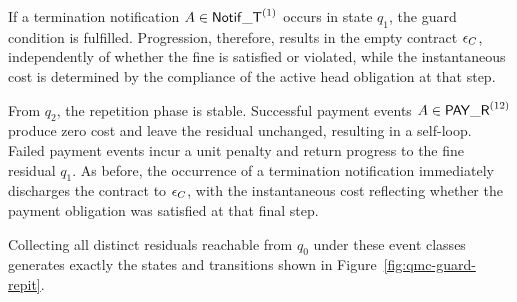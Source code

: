 \begin{example}
    If a termination notification $A \in \mathsf{Notif\_T}^{(1)}$ occurs in state $q_1$, the guard condition is fulfilled. Progression, therefore, results in the empty contract $\epsilon_{C}$, independently of whether the fine is satisfied or violated, while the instantaneous cost is determined by the compliance of the active head obligation at that step.
    
    From $q_2$, the repetition phase is stable. Successful payment events $A \in \mathsf{PAY\_R}^{(12)}$ produce zero cost and leave the residual unchanged, resulting in a self-loop. Failed payment events incur a unit penalty and return progress to the fine residual $q_1$. As before, the occurrence of a termination notification immediately discharges the contract to $\epsilon_{C}$, with the instantaneous cost reflecting whether the payment obligation was satisfied at that final step.
    
    Collecting all distinct residuals reachable from $q_0$ under these event classes generates exactly the states and transitions shown in Figure~\ref{fig:qmc-guard-repit}.
    
    
    
\end{example}
